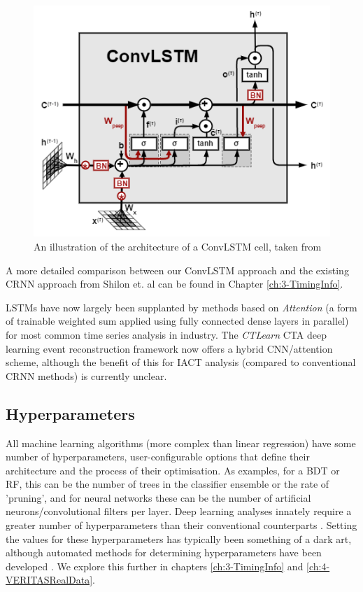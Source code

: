 \begin{figure}[ht] 
        \centering \includegraphics[width=0.5\columnwidth]{figures/convlstmcell.png}
        \caption{
                \label{fig:convlstmcell} %
                An illustration of the architecture of a ConvLSTM cell, taken from \cite{convlstmintro}
        }
\end{figure}
A more detailed comparison between our ConvLSTM approach and the existing CRNN approach from Shilon et. al \cite{Shilon} can be found in Chapter \ref{ch:3-TimingInfo}.

LSTMs have now largely been supplanted by methods based on \textit{Attention} (a form of trainable weighted sum applied using fully connected dense layers in parallel) for most common time series analysis in industry. The \textit{CTLearn} \cite{tjarkicrc} CTA deep learning event reconstruction framework now offers a hybrid CNN/attention scheme, although the benefit of this for IACT analysis (compared to conventional CRNN methods) is currently unclear.

\subsection{Hyperparameters}
All machine learning algorithms (more complex than linear regression) have some number of hyperparameters, user-configurable options that define their architecture and the process of their optimisation. As examples, for a BDT or RF, this can be the number of trees in the classifier ensemble or the rate of 'pruning', and for neural networks these can be the number of artificial neurons/convolutional filters per layer. Deep learning analyses innately require a greater number of hyperparameters than their conventional counterparts \cite{hyperopt}. Setting the values for these hyperparameters has typically been something of a dark art, although automated methods for determining hyperparameters have been developed \cite{hyperopt}. We explore this further in chapters \ref{ch:3-TimingInfo} and \ref{ch:4-VERITASRealData}.

